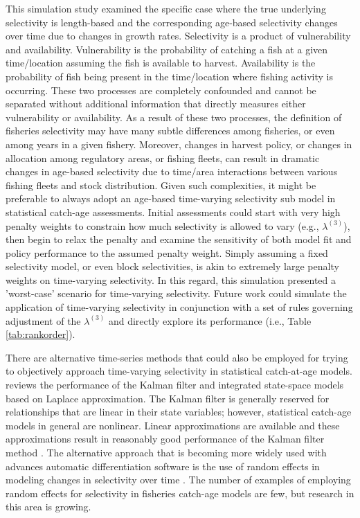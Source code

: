 \documentclass[review,letterpaper,10pt,authoryear]{elsarticle}
\begin{document}
This simulation study examined the specific case where the true underlying selectivity is length-based and the corresponding age-based selectivity changes over time due to changes in growth rates.  Selectivity is a product of vulnerability and availability.  Vulnerability is the probability of catching a fish at a given time/location assuming the fish is available to harvest.  Availability is the probability of fish being present in the time/location where fishing activity is occurring.  These two processes are completely confounded and cannot be separated without additional information that directly measures either vulnerability or availability.  As a result of these two processes, the definition of fisheries selectivity may have many subtle differences among fisheries, or even among years in a given fishery.  Moreover, changes in harvest policy, or changes in allocation among regulatory areas, or fishing fleets, can result in dramatic changes in age-based selectivity due to time/area interactions between various fishing fleets and stock distribution.  Given such complexities, it might be preferable to always adopt an age-based time-varying selectivity sub model in statistical catch-age assessments. Initial assessments could start with very high penalty weights to constrain how much selectivity is allowed to vary (e.g., $\lambda^{(3)}$), then begin to relax the penalty and examine the sensitivity of both model fit and policy performance to the assumed penalty weight.  Simply assuming a fixed selectivity model, or even block selectivities, is akin to extremely large penalty weights on time-varying selectivity.  In this regard, this simulation presented a 'worst-case' scenario for time-varying selectivity.  Future work could simulate the application of time-varying selectivity in conjunction with a set of rules governing adjustment of the $\lambda^{(3)}$  and directly explore its performance (i.e., Table \ref{tab:rankorder}).

There are alternative time-series methods that could also be employed for trying to objectively approach time-varying selectivity in statistical catch-at-age models.  \cite{gudmundsson2012selection} reviews the performance of the Kalman filter and integrated state-space models based on Laplace approximation.  The Kalman filter is generally reserved for relationships that are linear in their state variables; however, statistical catch-age models in general are nonlinear. Linear approximations are available and these approximations result in reasonably good performance of the Kalman filter method \citep{schnute1994general}. The alternative approach that is becoming more widely used with advances automatic differentiation software \citep{fournier2011ad} is the use of random effects in modeling changes in selectivity over time \citep[e.g.,][]{gudmundsson2012selection}.  The number of examples of employing random effects for selectivity in fisheries catch-age models are few, but research in this area is growing.
\end{document}
